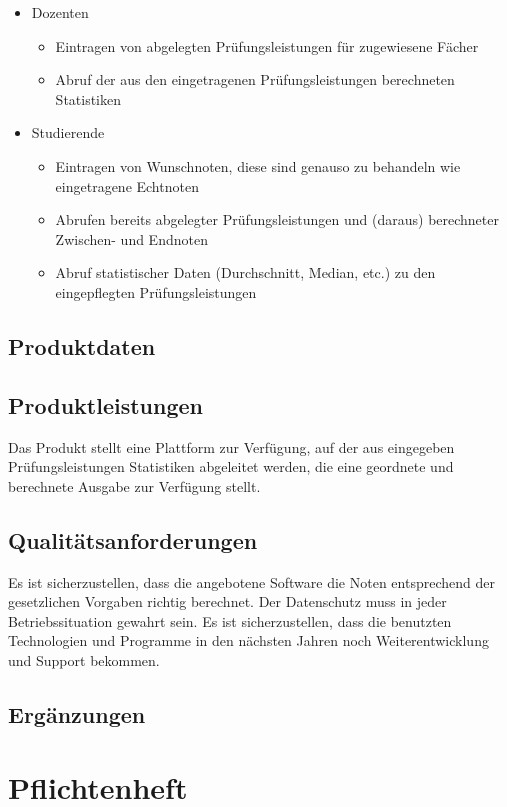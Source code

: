 \documentclass[12pt,a4paper,parskip]{scrreprt}
\begin{document}
\begin{itemize}
\begin{itemize}
\begin{itemize}
\end{itemize}
\item Dozenten
\begin{itemize}
\item Eintragen von abgelegten Prüfungsleistungen für zugewiesene Fächer
\item Abruf der aus den eingetragenen Prüfungsleistungen berechneten Statistiken
\end{itemize}
\item Studierende
\begin{itemize}
\item Eintragen von Wunschnoten, diese sind genauso zu behandeln wie eingetragene \glqq Echtnoten\grqq
\item Abrufen bereits abgelegter Prüfungsleistungen und (daraus) berechneter Zwischen- und Endnoten
\item Abruf statistischer Daten (Durchschnitt, Median, etc.) zu den eingepflegten Prüfungsleistungen
\end{itemize}
\end{itemize}
\end{itemize}
\subsection{Produktdaten}
\subsection{Produktleistungen}
Das Produkt stellt eine Plattform zur Verfügung, auf der aus eingegeben Prüfungsleistungen Statistiken abgeleitet werden, die eine geordnete und berechnete Ausgabe zur Verfügung stellt.
\subsection{Qualitätsanforderungen}
Es ist sicherzustellen, dass die angebotene Software die Noten entsprechend der gesetzlichen Vorgaben richtig berechnet. Der Datenschutz muss in jeder Betriebssituation gewahrt sein.
Es ist sicherzustellen, dass die benutzten Technologien und Programme in den nächsten Jahren noch Weiterentwicklung und Support bekommen.
\subsection{Ergänzungen}
\section{Pflichtenheft}
\end{document}
